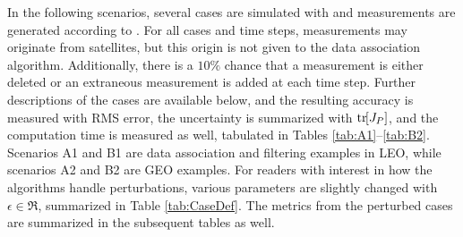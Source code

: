 In the following scenarios, several cases are simulated with  and measurements are generated according to .
For all cases and time steps, measurements may originate from satellites, but this origin is not given to the data association algorithm.
Additionally, there is a $10\%$ chance that a measurement is either deleted or an extraneous measurement is added at each time step.
Further descriptions of the cases are available below, and the resulting accuracy is measured with RMS error, the uncertainty is summarized with $\mathrm{tr}\negthickspace\left[ J_P \right]$, and the computation time is measured as well, tabulated in Tables \ref{tab:A1}--\ref{tab:B2}.
Scenarios A1 and B1 are data association and filtering examples in LEO, while scenarios A2 and B2 are GEO examples.
For readers with interest in how the algorithms handle perturbations, various parameters are slightly changed with $\epsilon\in\Re$, summarized in Table \ref{tab:CaseDef}.
The metrics from the perturbed cases are summarized in the subsequent tables as well.


